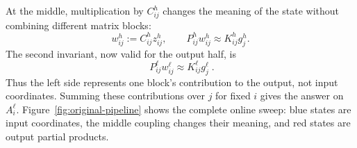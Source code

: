 \documentclass[11pt,a4paper]{article}
\begin{document}
At the middle, multiplication by $C_{ij}^h$ changes the meaning of the state without combining different matrix blocks:
\begin{equation}
 w_{ij}^h:=C_{ij}^hz_{ij}^h,
 \qquad
 P_{ij}^hw_{ij}^h\approx K_{ij}^hg_j^h.
 \label{eq:middle-handoff}
\end{equation}
The second invariant, now valid for the output half, is
\begin{equation}
 \boxed{\;P_{ij}^{\ell}w_{ij}^{\ell}\approx K_{ij}^{\ell}g_j^{\ell}\;}.
 \label{eq:target-invariant}
\end{equation}
Thus the left side represents one block's contribution to the output, not input coordinates. Summing these contributions over $j$ for fixed $i$ gives the answer on $A_i^\ell$. Figure~\ref{fig:original-pipeline} shows the complete online sweep: blue states are input coordinates, the middle coupling changes their meaning, and red states are output partial products.
\end{document}
